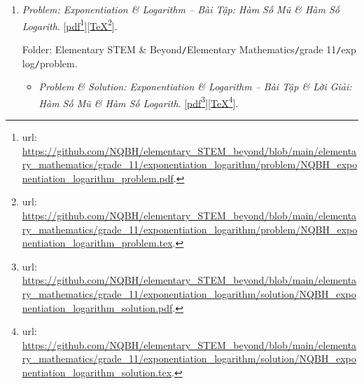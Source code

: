\documentclass[12pt,twoside]{book}
\begin{document}
\begin{enumerate}
	Folder: {\sf Elementary STEM \& Beyond{\tt/}Elementary Mathematics{\tt/}grade 11{\tt/}probability \& statistics{\tt/}problem}.
	\begin{itemize}
		\item {\it Problem \& Solution: Probability \& Statistics -- Bài Tập \& Lời Giải: Xác Suất \& Thống Kê}. [\href{https://github.com/NQBH/elementary_STEM_beyond/blob/main/elementary_mathematics/grade_11/probability_statistics/solution/NQBH_probability_statistics_solution.pdf}{pdf}\footnote{{\sc url}: \url{https://github.com/NQBH/elementary_STEM_beyond/blob/main/elementary_mathematics/grade_11/probability_statistics/solution/NQBH_probability_statistics_solution.pdf}.}][\href{https://github.com/NQBH/elementary_STEM_beyond/blob/main/elementary_mathematics/grade_11/probability_statistics/solution/NQBH_probability_statistics_solution.tex}{\TeX}\footnote{{\sc url}: \url{https://github.com/NQBH/elementary_STEM_beyond/blob/main/elementary_mathematics/grade_11/probability_statistics/solution/NQBH_probability_statistics_solution.tex}.}].
		
		Folder: {\sf Elementary STEM \& Beyond{\tt/}Elementary Mathematics{\tt/}grade 11{\tt/}probability \& statistics{\tt/}solution}.
	\end{itemize}	
	\item {\it Problem: Exponentiation \& Logarithm -- Bài Tập: Hàm Số Mũ \& Hàm Số Logarith}. [\href{https://github.com/NQBH/elementary_STEM_beyond/blob/main/elementary_mathematics/grade_11/exponentiation_logarithm/problem/NQBH_exponentiation_logarithm_problem.pdf}{pdf}\footnote{{\sc url}: \url{https://github.com/NQBH/elementary_STEM_beyond/blob/main/elementary_mathematics/grade_11/exponentiation_logarithm/problem/NQBH_exponentiation_logarithm_problem.pdf}.}][\href{https://github.com/NQBH/elementary_STEM_beyond/blob/main/elementary_mathematics/grade_11/exponentiation_logarithm/problem/NQBH_exponentiation_logarithm_problem.tex}{\TeX}\footnote{{\sc url}: \url{https://github.com/NQBH/elementary_STEM_beyond/blob/main/elementary_mathematics/grade_11/exponentiation_logarithm/problem/NQBH_exponentiation_logarithm_problem.tex}.}].
	
	Folder: {\sf Elementary STEM \& Beyond{\tt/}Elementary Mathematics{\tt/}grade 11{\tt/}exp log{\tt/}problem}.
	\begin{itemize}
		\item {\it Problem \& Solution: Exponentiation \& Logarithm -- Bài Tập \& Lời Giải: Hàm Số Mũ \& Hàm Số Logarith}. [\href{https://github.com/NQBH/elementary_STEM_beyond/blob/main/elementary_mathematics/grade_11/exponentiation_logarithm/solution/NQBH_exponentiation_logarithm_solution.pdf}{pdf}\footnote{{\sc url}: \url{https://github.com/NQBH/elementary_STEM_beyond/blob/main/elementary_mathematics/grade_11/exponentiation_logarithm/solution/NQBH_exponentiation_logarithm_solution.pdf}.}][\href{https://github.com/NQBH/elementary_STEM_beyond/blob/main/elementary_mathematics/grade_11/exponentiation_logarithm/solution/NQBH_exponentiation_logarithm_solution.tex}{\TeX}\footnote{{\sc url}: \url{https://github.com/NQBH/elementary_STEM_beyond/blob/main/elementary_mathematics/grade_11/exponentiation_logarithm/solution/NQBH_exponentiation_logarithm_solution.tex}.}].
		

\end{itemize}
\end{enumerate}
\end{document}
